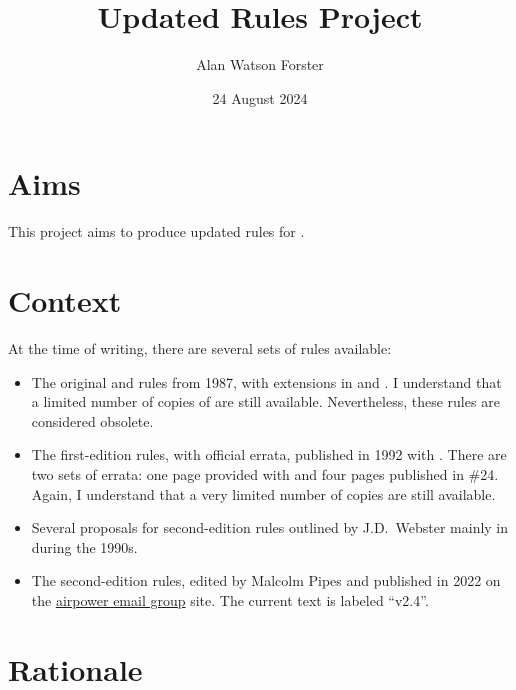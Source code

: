 \documentclass[10pt]{article}
\title{Updated Rules Project}
\author{Alan Watson Forster}
\date{24 August 2024}
\begin{document}
\twocolumn
\thispagestyle{empty}
\maketitle
\suppressfloats

\section{Aims}

This project aims to produce updated rules for {\AirPow}.

\section{Context}

At the time of writing, there are several sets of rules available:
\begin{itemize}
    \item The original {\AirSup} and {\AirStr} rules from 1987, with extensions in {\DF} and {\EOTG}. I understand that a limited number of copies of {\AirSup} are still available. Nevertheless, these rules are considered obsolete.
    \item The first-edition {\AirPow} rules, with official errata, published in 1992 with {\TSOH}. There are two sets of errata: one page provided with {\TSOH} and four pages published in {\APJ} \#24. Again, I understand that a very limited number of copies are still available.
    \item Several proposals for second-edition rules outlined by J.D.\ Webster mainly in {\APJ} during the 1990s.
    \item The second-edition {\AirPow} rules, edited by Malcolm Pipes and published in 2022 on the \href{https://airpower.groups.io/g/main}{airpower email group} site. The current text is labeled “v2.4”.
\end{itemize}

\section{Rationale}
\end{document}
